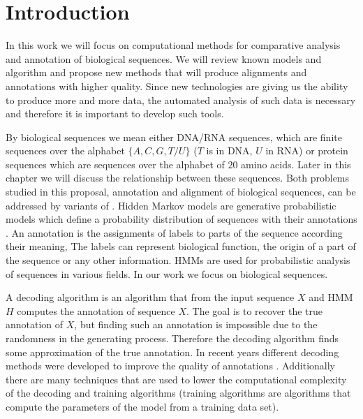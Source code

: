 \chapter{Introduction}


In this work we will focus on computational methods for comparative analysis and
annotation of biological sequences. We will review known models and algorithm
and propose new methods that will produce alignments and annotations with higher
quality. Since new technologies are giving us the ability to produce more and
more data, the automated analysis of such data is necessary and therefore it is
important to develop such tools.

By biological sequences we mean either DNA/RNA sequences, which are finite
sequences over the alphabet $\{A,C,G,T/U\}$ ($T$ is in DNA, $U$ in RNA) or
protein sequences which are sequences over the alphabet of $20$ amino acids.
Later in this chapter we will discuss the relationship between these sequences.
Both problems studied in this proposal, annotation and alignment of biological
sequences, can be addressed by variants of .  Hidden Markov models are generative probabilistic models which
define a probability distribution of sequences with their annotations
\cite{Durbin1998}. An annotation is the assignments of labels to parts of the
sequence according their meaning, The labels can represent biological function,
the origin of a part of the sequence or any other information. HMMs are used for
probabilistic analysis of sequences in various fields. In our work we focus on
biological sequences. 

A decoding algorithm is an algorithm that from the input sequence $X$ and HMM
$H$ computes the annotation of sequence $X$. The goal is to recover the true
annotation of $X$, but finding such an annotation is impossible due to the
randomness in the generating process. Therefore the decoding algorithm finds
some approximation of the true annotation.  In recent years different decoding
methods were developed to improve the quality of annotations
\cite{Gross2007,Nanasi2010,Nanasi2010mgr,Truszkowski2011}.  Additionally there
are many techniques that are used to lower the computational complexity of the
decoding and training algorithms (training algorithms are algorithms that
compute the parameters of the model from a training data set).

